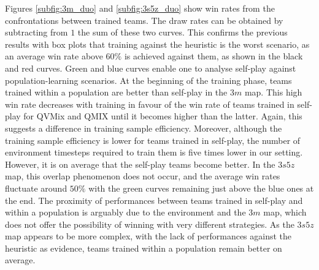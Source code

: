 Figures \ref{subfig:3m_duo} and \ref{subfig:3s5z_duo} show win rates from the confrontations between trained teams.
The draw rates can be obtained by subtracting from $1$ the sum of these two curves.
This confirms the previous results with box plots that training against the heuristic is the worst scenario, as an average win rate above $60\%$ is achieved against them, as shown in the black and red curves.
Green and blue curves enable one to analyse self-play against population-learning scenarios.
At the beginning of the training phase, teams trained within a population are better than self-play in the $3m$ map.
This high win rate decreases with training in favour of the win rate of teams trained in self-play for QVMix and QMIX until it becomes higher than the latter.
Again, this suggests a difference in training sample efficiency.
Moreover, although the training sample efficiency is lower for teams trained in self-play, the number of environment timesteps required to train them is five times lower in our setting.
However, it is on average that the self-play teams become better.
In the $3s5z$ map, this overlap phenomenon does not occur, and the average win rates fluctuate around $50\%$ with the green curves remaining just above the blue ones at the end.
The proximity of performances between teams trained in self-play and within a population is arguably due to the environment and the $3m$ map, which does not offer the possibility of winning with very different strategies.
As the $3s5z$ map appears to be more complex, with the lack of performances against the heuristic as evidence, teams trained within a population remain better on average.

